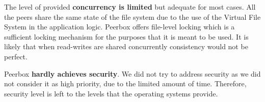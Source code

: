 The level of provided \textbf{concurrency is limited} but adequate for most cases. All the peers share the same state of the file system due to the use of the Virtual File System in the application logic. Peerbox offers file-level locking which is a sufficient locking mechanism for the purposes that it is meant to be used. It is likely that when read-writes are shared concurrently consistency would not be perfect. 


Peerbox \textbf{hardly achieves security}. We did not try to address security as we did not consider it as high priority, due to the limited amount of time. Therefore, security level is left to the levels that the operating systems provide. 